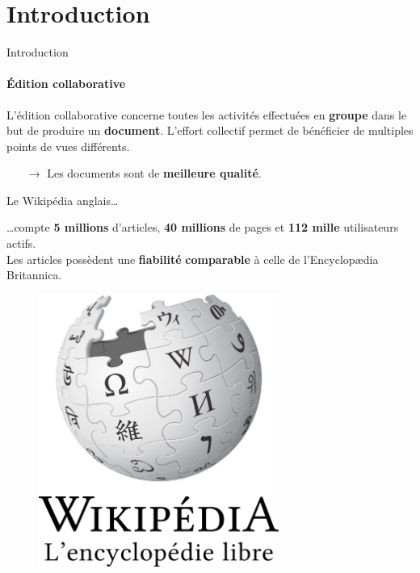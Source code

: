 \section{Introduction}


\begin{frame}{Introduction}\framesubtitle{Édition collaborative}

  L'édition collaborative concerne toutes les activités effectuées en
  \textbf{groupe} dans le but de produire un \textbf{document}. L'effort
  collectif permet de bénéficier de multiples points de vues différents.

  \begin{itemize}
  \item[$\rightarrow$] Les documents sont de \textbf{meilleure qualité}.
  \end{itemize}
  
  \vspace{0.25cm}

  \noindent
  \begin{exampleblock}{Le Wikipédia anglais\ldots}
  \begin{minipage}{0.6\textwidth}
    \ldots compte \textbf{5 millions} d'articles, \textbf{40 millions}
      de pages et \textbf{112 mille} utilisateurs actifs.\\Les articles
      possèdent une \textbf{fiabilité} \textbf{comparable} à celle de
      l'Encyclopædia Britannica.
  \end{minipage}
  \hfill
  \begin{minipage}{0.3\textwidth}
    \begin{figure}
      \begin{center}
        \includegraphics[width=0.7\textwidth]{img/wikipedia.png}
      \end{center}
    \end{figure}
  \end{minipage}
  \end{exampleblock}

\end{frame}



